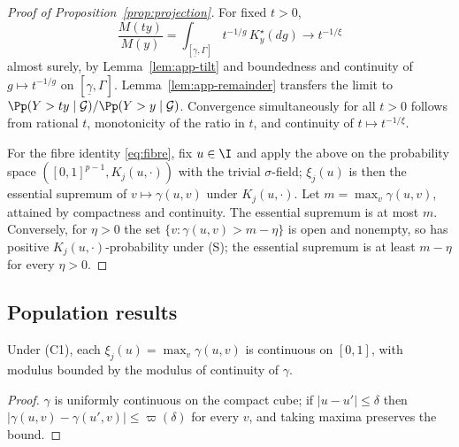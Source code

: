 \begin{proof}[Proof of Proposition~\ref{prop:projection}]
For fixed $t>0$,
\[
 \frac{M(ty)}{M(y)}
 =\int_{[\underline\gamma,\Gamma]}t^{-1/g}\,K_y^\star(dg)
 \longrightarrow t^{-1/\xi}
\]
almost surely, by Lemma~\ref{lem:app-tilt} and boundedness and continuity
of $g\mapsto t^{-1/g}$ on $[\underline\gamma,\Gamma]$.
Lemma~\ref{lem:app-remainder} transfers the limit to
$\Pp(Y>ty\mid\mathcal G)/\Pp(Y>y\mid\mathcal G)$.  Convergence
simultaneously for all $t>0$ follows from rational $t$, monotonicity of
the ratio in $t$, and continuity of $t\mapsto t^{-1/\xi}$.

For the fibre identity \eqref{eq:fibre}, fix $u\in\I$ and apply the above
on the probability space $([0,1]^{p-1},K_j(u,\cdot))$ with the trivial
$\sigma$-field; $\xi_j(u)$ is then the essential supremum of
$v\mapsto\gamma(u,v)$ under $K_j(u,\cdot)$.  Let
$m=\max_v\gamma(u,v)$, attained by compactness and continuity.  The
essential supremum is at most $m$.  Conversely, for $\eta>0$ the set
$\{v:\gamma(u,v)>m-\eta\}$ is open and nonempty, so has positive
$K_j(u,\cdot)$-probability under (S); the essential supremum is at least
$m-\eta$ for every $\eta>0$.
\end{proof}

\subsection{Population results}\label{app:population}

\begin{lemma}\label{lem:app-envelope-cont}
Under (C1), each $\xi_j(u)=\max_v\gamma(u,v)$ is continuous on $[0,1]$,
with modulus bounded by the modulus of continuity of $\gamma$.
\end{lemma}

\begin{proof}
$\gamma$ is uniformly continuous on the compact cube; if
$|u-u'|\le\delta$ then $|\gamma(u,v)-\gamma(u',v)|\le\varpi(\delta)$ for
every $v$, and taking maxima preserves the bound.
\end{proof}

